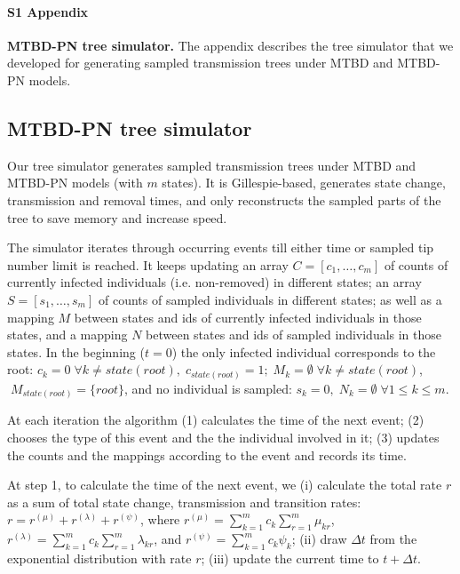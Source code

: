 \documentclass[10pt,letterpaper]{article}
\begin{document}
\paragraph*{S1 Appendix}
\label{S1_Appendix}

{\bf MTBD-PN tree simulator.} The appendix describes the tree simulator that we developed for generating sampled transmission trees under MTBD and MTBD-PN models.

\subsection*{MTBD-PN tree simulator}

Our tree simulator generates sampled transmission trees under MTBD and MTBD-PN models (with $m$ states). It is Gillespie-based, generates state change, transmission and removal times, and only reconstructs the sampled parts of the tree to save memory and increase speed.  

The simulator iterates through occurring events till either time or sampled tip number limit is reached. 
It keeps updating an array $C = [c_1, \ldots, c_m]$ of counts of currently infected individuals (i.e. non-removed) in different states; an array $S = [s_1, \ldots, s_m]$ of counts of sampled individuals in different states; as well as a mapping $M$ between states and ids of currently infected individuals in those states, and a mapping $N$ between states and ids of sampled individuals in those states.  In the beginning ($t=0$) the only infected individual corresponds to the root: $c_k = 0 \;\forall k \neq state(root), \;c_{state(root)} = 1; \;M_k = \emptyset \; \forall k \neq state(root)$, $ \; M_{state(root)} = \{root\}$, and no individual is sampled: $s_k=0,\;N_k = \emptyset \; \forall 1 \leq k \leq m$.

At each iteration the algorithm (1) calculates the time of the next event; (2) chooses the type of this event and the the individual involved in it; (3) updates the counts and the mappings according to the event and records its time.

At step 1, to calculate the time of the next event, we (i) calculate the total rate $r$ as a sum of total state change, transmission and transition rates: $r = r^{(\mu)} + r^{(\lambda)} + r^{(\psi)}$, where $r^{(\mu)} = \sum\limits_{k=1}^{m} c_k \sum\limits_{r=1}^{m} \mu_{kr}$, $r^{(\lambda)} = \sum\limits_{k=1}^{m} c_k \sum\limits_{r=1}^{m} \lambda_{kr}$, and $r^{(\psi)} = \sum\limits_{k=1}^{m} c_k \psi_{k}$; (ii) draw $\Delta t$ from the exponential distribution with rate $r$; (iii) update the current time to $t + \Delta t$.
\end{document}
